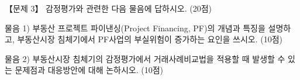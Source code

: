 \begin{longquestion}{【문제 3】}
감정평가와 관련한 다음 물음에 답하시오. (20점) \par
\medskip\noindent 물음 1) 부동산 프로젝트 파이낸싱(Project Financing, PF)의 개념과 특징을 설명하고, 부동산시장 침체기에서 PF사업의 부실위험이 증가하는 요인을 쓰시오. (10점) \par
\medskip\noindent 물음 2) 부동산시장 침체기의 감정평가에서 거래사례비교법을 적용할 때 발생할 수 있는 문제점과 대응방안에 대해 논하시오. (10점) \par
\end{longquestion}
